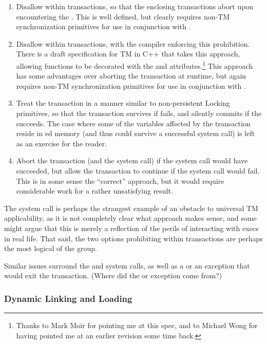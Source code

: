 \begin{enumerate}
\item	Disallow  within transactions, so that the enclosing
	transactions abort upon encountering the .
	This is well defined, but clearly requires non-TM synchronization
	primitives for use in conjunction with .
\item	Disallow  within transactions, with the compiler
	enforcing this prohibition.
	There is a draft specification for TM in C++ that takes
	this approach, allowing functions to be decorated with
	the  and 
	attributes.\footnote{
		Thanks to Mark Moir for pointing me at this spec, and
		to Michael Wong for having pointed me at an earlier
		revision some time back.}
	This approach has some advantages over aborting the transaction
	at runtime, but again requires non-TM synchronization primitives
	for use in conjunction with .
\item	Treat the transaction in a manner similar to non-persistent
	Locking primitives, so that the transaction survives if 
	fails, and silently commits if the  succeeds.
	The case where some of the variables affected by the transaction
	reside in ed memory (and thus could survive a successful
	 system call) is left as an exercise for the reader.
\item	Abort the transaction (and the  system call) if the
	 system call would have succeeded, but allow the
	transaction to continue if the  system call would
	fail.
	This is in some sense the ``correct'' approach, but it would
	require considerable work for a rather unsatisfying result.
\end{enumerate}

The  system call is perhaps the strangest example of an
obstacle to universal TM applicability, as it is not completely clear
what approach makes sense, and some might argue that this is merely a
reflection of the perils of interacting with execs in real life.
That said, the two options prohibiting  within transactions
are perhaps the most logical of the group.

Similar issues surround the  and  system calls,
as well as a  or an exception that would exit the transaction.
(Where did the  or exception come from?)

\subsubsection{Dynamic Linking and Loading}
\label{sec:future:Dynamic Linking and Loading}

